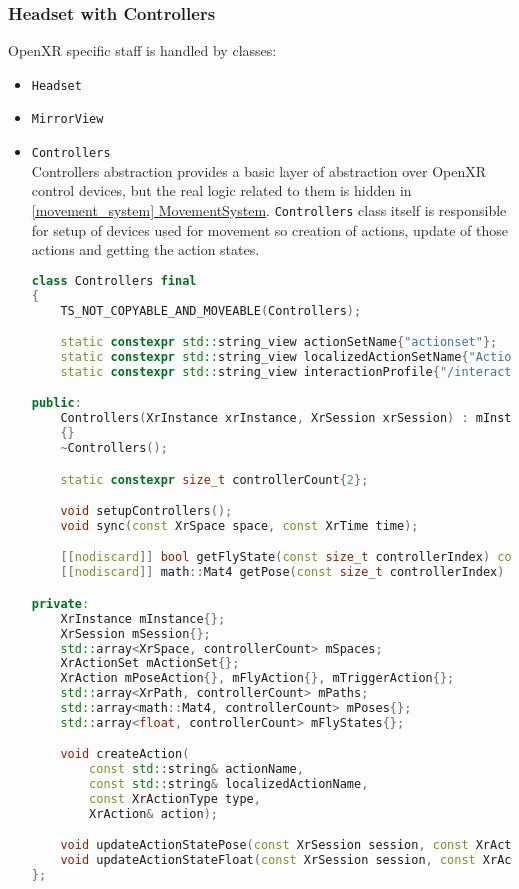 \subsubsection{Headset with Controllers}
\label{sec:headset}
\hspace{\parindent}OpenXR specific staff is handled by classes:
\begin{itemize}
    \item \texttt{Headset}\\
    \item \texttt{MirrorView}\\
    \item \texttt{Controllers}\\
    Controllers abstraction provides a basic layer of abstraction over OpenXR control devices, but the real logic related to them is hidden in \hyperref[movement_system]{\ref*{movement_system} MovementSystem}. \texttt{Controllers} class itself is responsible for setup of devices used for movement so creation of actions, update of those actions and getting the action states.
\begin{lstlisting}[language=c++, caption=Controllers header(./engine/src/core/controllers.h)]
class Controllers final
{
    TS_NOT_COPYABLE_AND_MOVEABLE(Controllers);

    static constexpr std::string_view actionSetName{"actionset"};
    static constexpr std::string_view localizedActionSetName{"Actions"};
    static constexpr std::string_view interactionProfile{"/interaction_profiles/khr/simple_controller"};

public:
    Controllers(XrInstance xrInstance, XrSession xrSession) : mInstance(xrInstance), mSession(xrSession)
    {}
    ~Controllers();

    static constexpr size_t controllerCount{2};

    void setupControllers();
    void sync(const XrSpace space, const XrTime time);

    [[nodiscard]] bool getFlyState(const size_t controllerIndex) const { return mFlyStates.at(controllerIndex); }
    [[nodiscard]] math::Mat4 getPose(const size_t controllerIndex) const { return mPoses.at(controllerIndex); }

private:
    XrInstance mInstance{};
    XrSession mSession{};
    std::array<XrSpace, controllerCount> mSpaces;
    XrActionSet mActionSet{};
    XrAction mPoseAction{}, mFlyAction{}, mTriggerAction{};
    std::array<XrPath, controllerCount> mPaths;
    std::array<math::Mat4, controllerCount> mPoses{};
    std::array<float, controllerCount> mFlyStates{};

    void createAction(
        const std::string& actionName,
        const std::string& localizedActionName,
        const XrActionType type,
        XrAction& action);

    void updateActionStatePose(const XrSession session, const XrAction action, const XrPath path, XrActionStatePose& state);
    void updateActionStateFloat(const XrSession session, const XrAction action, const XrPath path, XrActionStateFloat& state);
};
\end{lstlisting}

\end{itemize}